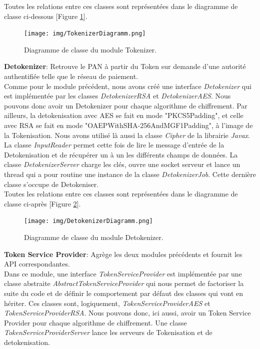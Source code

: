 \documentclass{report}
\begin{document}
\noindent
Toutes les relations entre ces classes sont représentées dans le diagramme de classe ci-dessous [Figure \ref{ArchitectureTokenizer}].

\begin{figure}[!ht]
    \centering
			\texttt{[image: img/TokenizerDiagramm.png]}
			\caption{\label{ArchitectureTokenizer} Diagramme de classe du module Tokenizer.}			
\end{figure}

\noindent
\textbf{Detokenizer}: Retrouve le PAN à partir du Token sur demande d'une autorité authentifiée telle que le réseau de paiement.\\

\noindent
Comme pour le module précédent, nous avons créé une interface \textit{Detokenizer} qui est implémentée par les classes \textit{DetokenizerRSA} et \textit{DetokenizerAES}. Nous pouvons donc avoir un Detokenizer pour chaque algorithme de chiffrement. Par ailleurs, la detokenisation avec AES se fait en mode "PKCS5Padding", et celle avec RSA se fait en mode "OAEPWithSHA-256AndMGF1Padding", à l'image de la Tokenisation. Nous avons utilisé là aussi la classe \textit{Cipher} de la librairie \textit{Javax}. La classe \textit{InputReader} permet cette fois de lire le message d'entrée de la Detokenisation et de récupérer un à un les différents champs de données. La classe \textit{DetokenizerServer} charge les clés, ouvre une socket serveur et lance un thread qui a pour routine une instance de la classe \textit{DetokenizerJob}. Cette dernière classe s'occupe de Detokeniser.\\

\noindent
Toutes les relations entre ces classes sont représentées dans le diagramme de classe ci-après [Figure \ref{ArchitectureDetokenizer}].

\begin{figure}[!ht]
    \centering
			\texttt{[image: img/DetokenizerDiagramm.png]}
			\caption{\label{ArchitectureDetokenizer} Diagramme de classe du module Detokenizer.}			
\end{figure}

\noindent
\textbf{Token Service Provider}: Agrège les deux modules précédents et fournit les API correspondantes.\\

\noindent
Dans ce module, une interface \textit{TokenServiceProvider} est implémentée par une classe abstraite \textit{AbstractTokenServiceProvider} qui nous permet de factoriser la suite du code et de définir le comportement par défaut des classes qui vont en hériter. Ces classes sont, logiquement, \textit{TokenServiceProviderAES} et \textit{TokenServiceProviderRSA}. Nous pouvons donc, ici aussi, avoir un Token Service Provider pour chaque algorithme de chiffrement. Une classe \textit{TokenServiceProviderServer} lance les serveurs de Tokenisation et de detokenisation.\\
\end{document}

